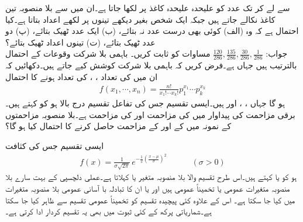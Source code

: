 \quad
{} سے لے کر  تک عدد کو علیحدہ علیحدہ کاغذ پر لکھا جاتا ہے۔ان میں سے بلا منصوبہ تین کاغذ نکالے جاتے ہیں جبکہ  ایک شخص  بغیر دیکھے  تینوں پر لکھے اعداد بتاتا ہے۔کیا احتمال ہے کہ وہ (الف) کوئی بھی درست عدد نہ بتائے، (ب) ایک عدد ٹھیک بتائے، (پ) دو عدد ٹھیک بتائے، (ت) تینوں اعداد ٹھیک بتائے؟  \\
جواب:\quad
$\tfrac{120}{286},\tfrac{135}{286},\tfrac{30}{286},\tfrac{1}{286}$ 
\quad
مساوات  کو ثابت کریں۔
\quad {}\quad
{}  باہمی بلا شرکت وقوعات  کے احتمال بالترتیب  ہیں  جہاں  ہے۔فرض کریں کہ  باہمی بلا شرکت کوشش کیے جاتے ہیں۔دکھائیں کہ ان میں  کی تعداد ، ،  کی تعداد  ہونے کا احتمال
\begin{align*}
f(x_1,\cdots,x_n)=\frac{n!}{x_1!\cdots x_k!}p_1^{x_1}\cdots p_k^{x_k}
\end{align*}
ہو گا جہاں ، ، اور  ہیں۔ایسی تقسیم جس کی تفاعل تقسیم درج بالا ہو کو  کہتے ہیں۔
\quad
برقی مزاحمت کی پیداوار میں  کی مزاحمت  اور  کی مزاحمت  ہے۔بلا منصوبہ  مزاحمتوں کے نمونہ میں  کے  اور  کے  مزاحمت حاصل کرنے کا احتمال کیا ہو گا؟

ایسی تقسیم جس کی کثافت
\begin{align}\label{مساوات_شماریات_عمومی_تقسیم_الف}
f(x)=\frac{1}{\sigma\sqrt{2\pi}}\,e^{-\frac{1}{2}(\frac{x-\mu}{\sigma})^2}\quad\quad\quad (\sigma>0)
\end{align}
ہو کو  یا  کہتے ہیں۔اس طرح تقسیم والا بلا منصوبہ متغیر  یا  کہلاتا ہے۔عملی دلچسپی کے بہت سارے بلا منصوبہ متغیرات عمومی یا تخمیناً عمومی ہیں اور یا ان کا تبادلہ با آسانی عمومی بلا منصوبہ متغیرات میں کیا جا سکتا ہے۔ اس کے علاوہ کئی پیچیدہ تقسیم کو تخمیناً عمومی تقسیم سے ظاہر کیا جا سکتا ہے۔شماریاتی پرکھ کے کئی ثبوت میں بھی یہ تقسیم کردار ادا کرتی ہے۔   


